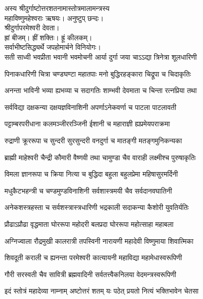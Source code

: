 
अस्य श्रीदुर्गाष्टोत्तरशतनामास्तोत्रमालामन्त्रस्य\\
महाविष्णुमहेश्वराः ऋषयः। अनुष्टुप् छन्दः।\\
श्रीदुर्गापरमेश्वरी देवता।\\
ह्रां बीजम्। ह्रीं शक्तिः। ह्रूं कीलकम्।\\
सर्वाभीष्टसिद्ध्यर्थे जपहोमार्चने विनियोगः।\\

\twolineshloka
{सती साध्वी भवप्रीता भवानी भवमोचनी}
{आर्या दुर्गा जया चाऽऽद्या त्रिनेत्रा शूलधारिणी}

\twolineshloka
{पिनाकधारिणी चित्रा चण्डघण्टा महातपाः}
{मनो बुद्धिरहङ्कारा चिद्रूपा च चिदाकृतिः}

\twolineshloka
{अनन्ता भाविनी भव्या ह्यभव्या च सदागतिः}
{शाम्भवी देवमाता च चिन्ता रत्नप्रिया तथा}

\twolineshloka
{सर्वविद्या दक्षकन्या दक्षयज्ञविनाशिनी}
{अपर्णाऽनेकवर्णा च पाटला पाटलावती}

\twolineshloka
{पट्टाम्बरपरीधाना कलमञ्जीररञ्जिनी}
{ईशानी च महाराज्ञी ह्यप्रमेयपराक्रमा}

\twolineshloka
{रुद्राणी क्रूररूपा च सुन्दरी सुरसुन्दरी}
{वनदुर्गा च मातङ्गी मतङ्गमुनिकन्यका}

\twolineshloka
{ब्राह्मी माहेश्वरी चैन्द्री कौमारी वैष्णवी तथा}
{चामुण्डा चैव वाराही लक्ष्मीश्च पुरुषाकृतिः}

\twolineshloka
{विमला ज्ञानरूपा च क्रिया नित्या च बुद्धिदा}
{बहुला बहुलप्रेमा महिषासुरमर्दिनी}

\twolineshloka
{मधुकैटभहन्त्री च चण्डमुण्डविनाशिनी}
{सर्वशास्त्रमयी चैव सर्वदानवघातिनी}

\twolineshloka
{अनेकशस्त्रहस्ता च सर्वशस्त्रास्त्रधारिणी}
{भद्रकाली सदाकन्या कैशोरी युवतिर्यतिः}

\twolineshloka
{प्रौढाऽप्रौढा वृद्धमाता घोररूपा महोदरी}
{बलप्रदा घोररूपा महोत्साहा महाबला}

\twolineshloka
{अग्निज्वाला रौद्रमुखी कालरात्री तपस्विनी}
{नारायणी महादेवी विष्णुमाया शिवात्मिका}

\twolineshloka
{शिवदूती कराली च ह्यनन्ता परमेश्वरी}
{कात्यायनी महाविद्या महामेधास्वरूपिणी}

\twolineshloka
{गौरी सरस्वती चैव सावित्री ब्रह्मवादिनी}
{सर्वतत्त्वैकनिलया वेदमन्त्रस्वरूपिणी}

\twolineshloka
{इदं स्तोत्रं महादेव्या नाम्नाम् अष्टोत्तरं शतम्}
{यः पठेत् प्रयतो नित्यं भक्तिभावेन चेतसा}


